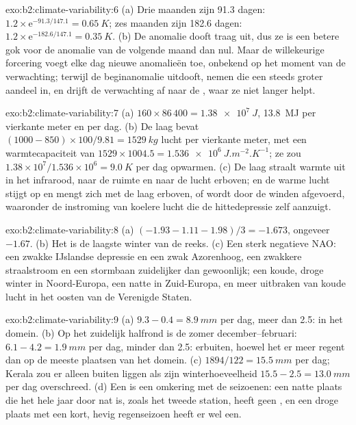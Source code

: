 \begin{solution}{exo:b2:climate-variability:6}
(a) Drie maanden zijn 91.3 dagen: $1.2 \times \mathrm{e}^{-91.3/147.1} = \qty{0.65}{K}$; zes maanden
zijn 182.6 dagen: $1.2 \times \mathrm{e}^{-182.6/147.1} = \qty{0.35}{K}$. (b) De anomalie dooft
traag uit, dus ze is een betere gok voor de anomalie van de volgende maand dan nul. Maar de willekeurige forcering voegt
elke dag nieuwe anomalieën toe, onbekend op het moment van de verwachting; terwijl de beginanomalie uitdooft,
nemen die een steeds groter aandeel in, en drijft de verwachting af naar de , waar ze niet
langer helpt.
\end{solution}

\begin{solution}{exo:b2:climate-variability:7}
(a) $160 \times 86\,400 = \qty{1.38e7}{J}$, \qty{13.8}{MJ} per vierkante meter en per dag. (b) De
laag bevat $(1000 - 850) \times 100/9.81 = \qty{1529}{kg}$ lucht per vierkante meter, met een
warmtecapaciteit van $1529 \times 1004.5 = \qty{1.536e6}{J.m^{-2}.K^{-1}}$; ze zou $1.38 \times
10^7/1.536 \times 10^6 = \qty{9.0}{K}$ per dag opwarmen. (c) De laag straalt warmte uit in het infrarood, naar
de ruimte en naar de lucht erboven; en de warme lucht stijgt op en mengt zich met de laag erboven, of wordt
door de winden afgevoerd, waaronder de instroming van koelere lucht die de hittedepressie zelf aanzuigt.
\end{solution}

\begin{solution}{exo:b2:climate-variability:8}
(a) $(-1.93 - 1.11 - 1.98)/3 = -1.673$, ongeveer $-1.67$. (b) Het is de laagste winter van de reeks.
(c) Een sterk negatieve NAO: een zwakke IJslandse depressie en een zwak Azorenhoog, een zwakkere straalstroom en een stormbaan
zuidelijker dan gewoonlijk; een koude, droge winter in Noord-Europa, een natte in Zuid-Europa,
en meer uitbraken van koude lucht in het oosten van de Verenigde Staten.
\end{solution}

\begin{solution}{exo:b2:climate-variability:9}
(a) $9.3 - 0.4 = \qty{8.9}{mm}$ per dag, meer dan 2.5: in het domein. (b) Op het zuidelijk halfrond
is de zomer december--februari: $6.1 - 4.2 = \qty{1.9}{mm}$ per dag, minder dan 2.5: erbuiten,
hoewel het er meer regent dan op de meeste plaatsen van het domein. (c) $1894/122 = \qty{15.5}{mm}$ per
dag; Kerala zou er alleen buiten liggen als zijn winterhoeveelheid $15.5 - 2.5 = \qty{13.0}{mm}$ per dag overschreed.
(d) Een  is een omkering met de seizoenen: een natte plaats die het hele jaar door nat is, zoals het tweede
station, heeft geen , en een droge plaats met een kort, hevig regenseizoen heeft er wel een.
\end{solution}

